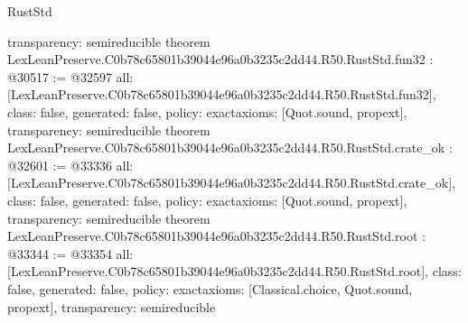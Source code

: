 \begin{lexlean}{RustStd}
\begin{coremodule}
{  transparency: semireducible
}
theorem LexLeanPreserve.C0b78c65801b39044e96a0b3235c2dd44.R50.RustStd.fun32 : @30517 := @32597 {
  all: [LexLeanPreserve.C0b78c65801b39044e96a0b3235c2dd44.R50.RustStd.fun32],
  class: false,
  generated: false,
  policy: exact{axioms: [Quot.sound, propext]},
  transparency: semireducible
}
theorem LexLeanPreserve.C0b78c65801b39044e96a0b3235c2dd44.R50.RustStd.crate_ok : @32601 := @33336 {
  all: [LexLeanPreserve.C0b78c65801b39044e96a0b3235c2dd44.R50.RustStd.crate_ok],
  class: false,
  generated: false,
  policy: exact{axioms: [Quot.sound, propext]},
  transparency: semireducible
}
theorem LexLeanPreserve.C0b78c65801b39044e96a0b3235c2dd44.R50.RustStd.root : @33344 := @33354 {
  all: [LexLeanPreserve.C0b78c65801b39044e96a0b3235c2dd44.R50.RustStd.root],
  class: false,
  generated: false,
  policy: exact{axioms: [Classical.choice, Quot.sound, propext]},
  transparency: semireducible
}


\end{coremodule}
\end{lexlean}
